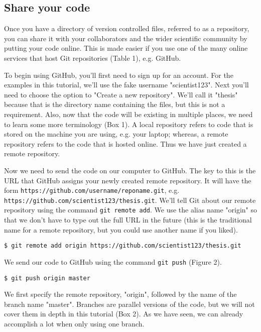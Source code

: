 \subsection{Share your code}

Once you have a directory of version controlled files, referred to as a repository, you can share it with your collaborators and the wider scientific community by putting your code online.
This is made easier if you use one of the many online services that host Git repositories (Table 1), e.g. GitHub.

To begin using GitHub, you'll first need to sign up for an account.
For the examples in this tutorial, we'll use the fake username "scientist123".
Next you'll need to choose the option to "Create a new repository".
We'll call it "thesis" because that is the directory name containing the files, but this is not a requirement.
Also, now that the code will be existing in multiple places, we need to learn some more terminology (Box 1).
A local repository refers to code that is stored on the machine you are using, e.g. your laptop; whereas, a remote repository refers to the code that is hosted online.
Thus we have just created a remote repository.

Now we need to send the code on our computer to GitHub.
The key to this is the URL that GitHub assigns your newly created remote repository.
It will have the form \verb|https://github.com/username/reponame.git|, e.g. \verb|https://github.com/scientist123/thesis.git|.
We'll tell Git about our remote repository using the command \verb|git remote add|.
We use the alias name "origin" so that we don't have to type out the full URL in the future (this is the traditional name for a remote repository, but you could use another name if you liked).

\begin{lstlisting}
$ git remote add origin https://github.com/scientist123/thesis.git
\end{lstlisting}

We send our code to GitHub using the command \verb|git push| (Figure 2).

\begin{lstlisting}
$ git push origin master
\end{lstlisting}

We first specify the remote repository, "origin", followed by the name of the branch name "master".
Branches are parallel versions of the code, but we will not cover them in depth in this tutorial (Box 2).
As we have seen, we can already accomplish a lot when only using one branch.

